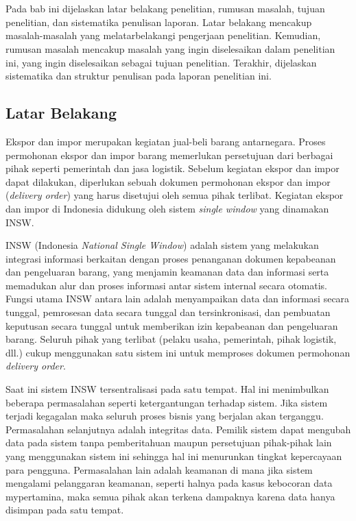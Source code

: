 \chapter{\babSatu}
\label{bab:1}

Pada bab ini dijelaskan latar belakang penelitian, rumusan masalah, tujuan penelitian, dan sistematika penulisan laporan. Latar belakang mencakup masalah-masalah yang melatarbelakangi pengerjaan penelitian. Kemudian, rumusan masalah mencakup masalah yang ingin diselesaikan dalam penelitian ini, yang ingin diselesaikan sebagai tujuan penelitian. Terakhir, dijelaskan sistematika dan struktur penulisan pada laporan penelitian ini.

\section{Latar Belakang}
\label{sec:latarBelakang}

Ekspor dan impor merupakan kegiatan jual-beli barang antarnegara. Proses permohonan ekspor dan impor barang memerlukan persetujuan dari berbagai pihak seperti pemerintah dan jasa logistik. Sebelum kegiatan ekspor dan impor dapat dilakukan, diperlukan sebuah dokumen permohonan ekspor dan impor (\textit{delivery order}) yang harus disetujui oleh semua pihak terlibat. Kegiatan ekspor dan impor di Indonesia didukung oleh sistem \textit{single window} yang dinamakan INSW.

INSW (Indonesia \textit{National Single Window}) adalah sistem yang melakukan integrasi informasi berkaitan dengan proses penanganan dokumen kepabeanan dan pengeluaran barang, yang menjamin keamanan data dan informasi serta memadukan alur dan proses informasi antar sistem internal secara otomatis. Fungsi utama INSW antara lain adalah menyampaikan data dan informasi secara tunggal, pemrosesan data secara tunggal dan tersinkronisasi, dan pembuatan keputusan secara tunggal untuk memberikan izin kepabeanan dan pengeluaran barang. Seluruh pihak yang terlibat (pelaku usaha, pemerintah, pihak logistik, dll.) cukup menggunakan satu sistem ini untuk memproses dokumen permohonan \textit{delivery order}.

Saat ini sistem INSW tersentralisasi pada satu tempat. Hal ini menimbulkan beberapa permasalahan seperti ketergantungan terhadap sistem. Jika sistem terjadi kegagalan maka seluruh proses bisnis yang berjalan akan terganggu. Permasalahan selanjutnya adalah integritas data. Pemilik sistem dapat mengubah data pada sistem tanpa pemberitahuan maupun persetujuan pihak-pihak lain yang menggunakan sistem ini sehingga hal ini menurunkan tingkat kepercayaan para pengguna. Permasalahan lain adalah keamanan di mana jika sistem mengalami pelanggaran keamanan, seperti halnya pada kasus kebocoran data mypertamina, maka semua pihak akan terkena dampaknya karena data hanya disimpan pada satu tempat. 

